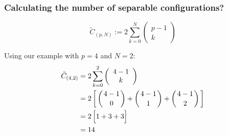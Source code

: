 \begin{frame}\frametitle{Calculating the number of separable configurations?}

\begin{equation*}
	\tilde C_{(p,N)} := 2 \sum_{k=0}^{N} \left( \begin{array}{c}
	p-1\\
	k
	\end{array}\right)
\end{equation*}

Using our example with $p=4$ and $N=2$:
\begin{align}
	\tilde C_{(4,2)} &= 2 \sum_{k=0}^{2} \left( \begin{array}{c}
	4-1\\
	k
	\end{array}\right)\\
	&= 2 \,
	\bigg\lbrack
	\left({4-1 \atop {\color{black}0}}\right)
	+
	\left({4-1 \atop {\color{black}1}}\right)
	+
	\left({4-1 \atop {\color{black}2}}\right)
	\bigg\rbrack\\
	&= 2 \, \Big\lbrack
	1 + 3 + 3
	\Big\rbrack\\
	&= 14
\end{align}


\end{frame}

